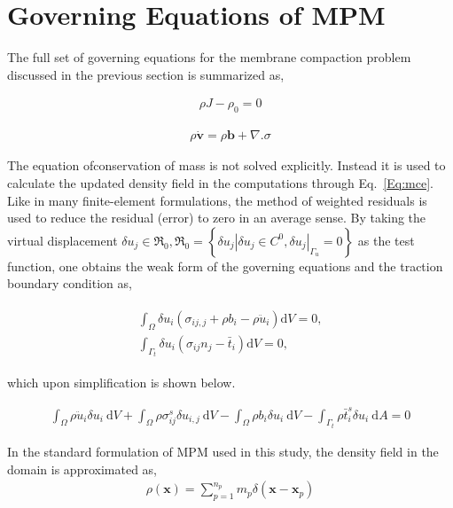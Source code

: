 \section{Governing Equations of MPM}
The full set of governing equations for the membrane compaction problem discussed in the previous section is summarized as,

\begin{align}
\rho J-\rho_0=0
\label{Eq:mce}
\end{align}

\begin{align}
\rho \dot{\mathbf{v}} = \rho \mathbf{b} + \nabla . \sigma
\end{align}

The equation ofconservation of mass is not solved explicitly. Instead it is used to calculate the updated density field in the computations through Eq.~\ref{Eq:mce}. Like in many finite-element formulations, the method of weighted residuals is used to reduce the residual (error) to zero in an average sense. By taking the virtual displacement $\delta u_j \in \Re_0, \Re_0=\left\{\delta u_j\left|\delta u_j \in C^0, \delta u_j\right|_{\Gamma_u}=0\right\}$ as the test function, one obtains the weak form of the governing equations and the traction boundary condition as,

\begin{align}
	\begin{array}{r}
\int_{\Omega} \delta u_i\left(\sigma_{i j, j}+\rho b_i-\rho \ddot{u}_i\right) \mathrm{d} V=0, \\
\int_{\Gamma_t} \delta u_i\left(\sigma_{i j} n_j-\bar{t}_i\right) \mathrm{d} V=0,
\end{array}
\end{align}

which upon simplification is shown below.

\begin{align}
\int_{\Omega} \rho \ddot{u}_i \delta u_i \mathrm{~d} V+\int_{\Omega} \rho \sigma_{i j}^s \delta u_{i, j} \mathrm{~d} V-\int_{\Omega} \rho b_i \delta u_i \mathrm{~d} V-\int_{\Gamma_t} \rho \bar{t}_i^s \delta u_i \mathrm{~d} A=0
\label{Eq:GovEqMPM}
\end{align}

In the standard formulation of MPM used in this study, the density field in the domain is approximated as,
\begin{align}
\rho(\boldsymbol{x})=\sum_{p=1}^{n_p} m_p \delta\left(\boldsymbol{x}-\boldsymbol{x}_p\right)
\label{Eq:rho_def}
\end{align}

